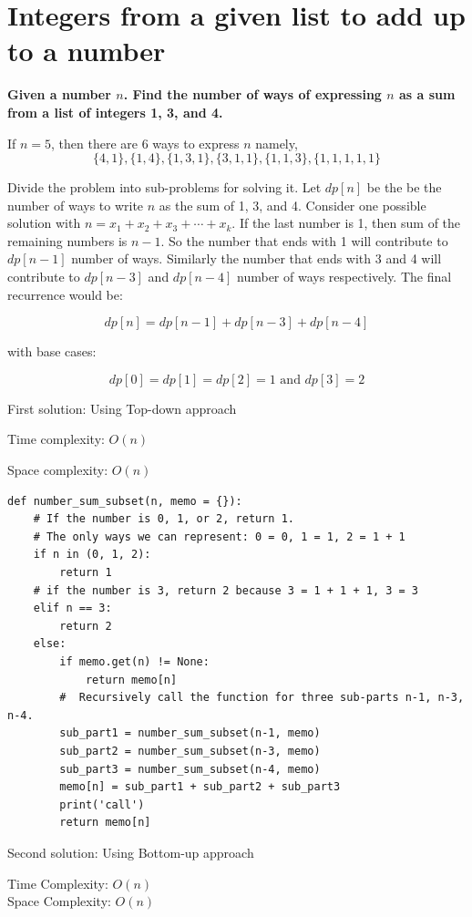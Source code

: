 \documentclass[a4paper,11pt]{book}
\begin{document}
\section{Integers from a given list to add up to a number}

\noindent \textbf{Given a number $n$. Find the number of ways of expressing $n$ as a sum from a list of integers 1, 3, and 4.}
\vspace{5mm}

\noindent If $n = 5$, then there are 6 ways to express $n$ namely, $$\{4,1\}, \{1,4\}, \{1,3,1\}, \{3,1,1\}, \{1,1,3\}, \{1,1,1,1,1\}$$

\noindent Divide the problem into sub-problems for solving it. Let $dp[n]$ be the be the number of ways to write $n$ as the sum of 1, 3, and 4. Consider one possible solution with $n = x_1 + x_2 + x_3 + \cdots + x_k$. If the last number is 1, then sum of the remaining numbers is $n-1$. So the number that ends with 1 will contribute to $dp[n-1]$ number of ways. Similarly the number that ends with 3 and 4 will contribute to $dp[n-3]$ and $dp[n-4]$ number of ways respectively. The final recurrence would be: 

$$dp[n] = dp[n-1] + dp[n-3] + dp[n-4]$$

\noindent with base cases:

$$dp[0] = dp[1] = dp[2] = 1 \text{ and } dp[3] = 2$$

\noindent First solution: Using Top-down approach

\noindent Time complexity:  $O(n)$

\noindent Space complexity: $O(n)$
\begin{lstlisting}
def number_sum_subset(n, memo = {}):
    # If the number is 0, 1, or 2, return 1.
    # The only ways we can represent: 0 = 0, 1 = 1, 2 = 1 + 1
    if n in (0, 1, 2):
        return 1
    # if the number is 3, return 2 because 3 = 1 + 1 + 1, 3 = 3
    elif n == 3:
        return 2
    else:
        if memo.get(n) != None:
            return memo[n]
        #  Recursively call the function for three sub-parts n-1, n-3, n-4.
        sub_part1 = number_sum_subset(n-1, memo)
        sub_part2 = number_sum_subset(n-3, memo)
        sub_part3 = number_sum_subset(n-4, memo)
        memo[n] = sub_part1 + sub_part2 + sub_part3
        print('call')
        return memo[n]
\end{lstlisting}

\noindent Second solution: Using Bottom-up approach

\noindent Time Complexity: $O(n)$\\
\noindent Space Complexity: $O(n)$
\end{document}
